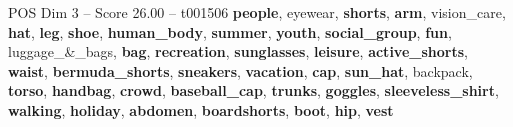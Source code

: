 \begin{textsample}{POS Dim 3 – Score 26.00 – t001506}  \label{ex:f3_pos_010}
\textbf{people}, eyewear, \textbf{shorts}, \textbf{arm}, vision\_care, \textbf{hat}, \textbf{leg}, \textbf{shoe}, \textbf{human\_body}, \textbf{summer}, \textbf{youth}, \textbf{social\_group}, \textbf{fun}, luggage\_\&\_bags, \textbf{bag}, \textbf{recreation}, \textbf{sunglasses}, \textbf{leisure}, \textbf{active\_shorts}, \textbf{waist}, \textbf{bermuda\_shorts}, \textbf{sneakers}, \textbf{vacation}, \textbf{cap}, \textbf{sun\_hat}, backpack, \textbf{torso}, \textbf{handbag}, \textbf{crowd}, \textbf{baseball\_cap}, \textbf{trunks}, \textbf{goggles}, \textbf{sleeveless\_shirt}, \textbf{walking}, \textbf{holiday}, \textbf{abdomen}, \textbf{boardshorts}, \textbf{boot}, \textbf{hip}, \textbf{vest}

\end{textsample}
